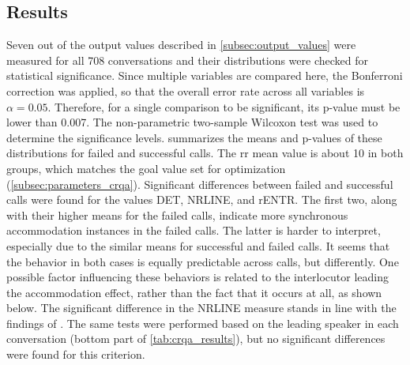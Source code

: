 \subsection{Results}
\label{subsec:results_hhi}

Seven out of the output values described in \cref{subsec:output_values} were measured for all 708 conversations and their distributions were checked for statistical significance.
Since multiple variables are compared here, the Bonferroni correction \citep{Bonferroni1936teoria} was applied, so that the overall error rate across all variables is $\alpha = 0.05$.
Therefore, for a single comparison to be significant, its p-value must be lower than 0.007.
The non-parametric two-sample Wilcoxon test \citep{Wilcoxon1945individual} was used to determine the significance levels.
 summarizes the means and p-values of these distributions for failed and successful calls.
The \ac{rr} mean value is about 10 in both groups, which matches the goal value set for optimization (\cref{subsec:parameters_crqa}).
Significant differences between failed and successful calls were found for the values DET, NRLINE, and rENTR.
The first two, along with their higher means for the failed calls, indicate more synchronous accommodation instances in the failed calls.
The latter is harder to interpret, especially due to the similar means for successful and failed calls.
It seems that the behavior in both cases is equally predictable across calls, but differently.
One possible factor influencing these behaviors is related to the interlocutor leading the accommodation effect, rather than the fact that it occurs at all, as shown below.
The significant difference in the NRLINE measure stands in line with the findings of \citet{Borrie2019syncing}.
The same tests were performed based on the leading speaker in each conversation (bottom part of \cref{tab:crqa_results}), but no significant differences were found for this criterion.

